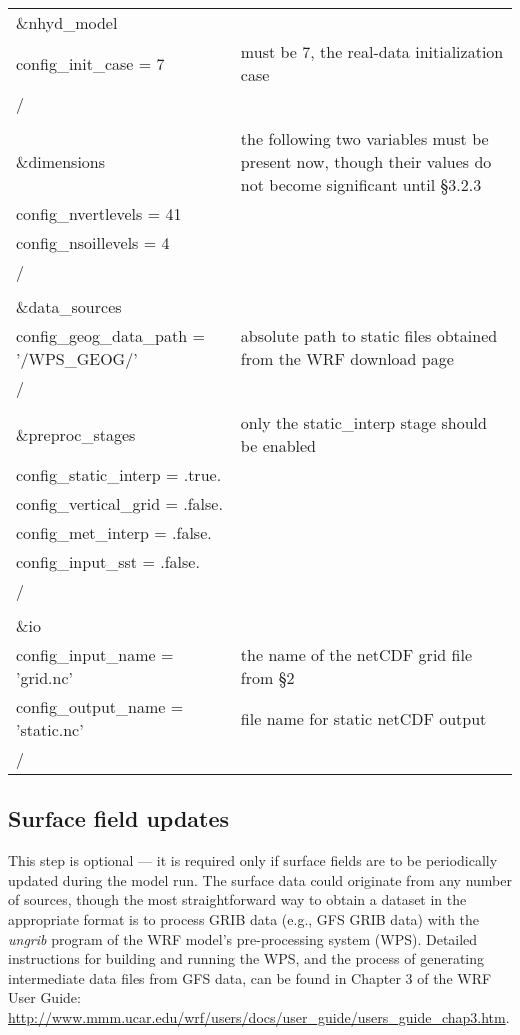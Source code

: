 \begin{longtable}{p{3.0in} |p{3.25in}}

\&nhyd\_model\\
   config\_init\_case       = 7                      & must be 7, the real-data initialization case \\
/\\
\\
\&dimensions                                         & the following two variables must be present now, though their values do not become significant until \S 3.2.3 \\
   config\_nvertlevels     = 41                      &  \\
   config\_nsoillevels     = 4                       &  \\
/\\
\\
\&data\_sources\\
   config\_geog\_data\_path  = '/WPS\_GEOG/'         & absolute path to static files obtained from the WRF download page\\
/\\
\\
\&preproc\_stages                                    & only the static\_interp stage should be enabled \\
   config\_static\_interp   = .true.                 & \\
   config\_vertical\_grid   = .false.                & \\
   config\_met\_interp      = .false.                & \\
   config\_input\_sst       = .false.                & \\
/\\
\\
\&io\\
   config\_input\_name         = 'grid.nc'           & the name of the netCDF grid file from \S 2 \\
   config\_output\_name        = 'static.nc'         & file name for static netCDF output \\
/\\

\end{longtable}


\subsection{Surface field updates}

This step is optional --- it is required only if surface fields are to be periodically updated during the model run.  The surface data could originate from any number of sources, though the most straightforward way to obtain a dataset in the appropriate format is to process GRIB data (e.g., GFS GRIB data) with the {\em ungrib} program of the WRF model's pre-processing system (WPS).  Detailed instructions for building and running the WPS, and the process of generating intermediate data files from GFS data, can be found in Chapter 3 of the WRF User Guide: \url{http://www.mmm.ucar.edu/wrf/users/docs/user\_guide/users\_guide\_chap3.htm}.

